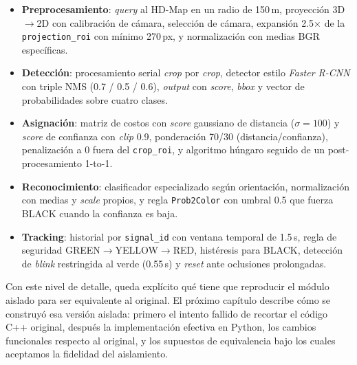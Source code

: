 \begin{itemize}
    \item \textbf{Preprocesamiento}: \textit{query} al HD-Map en un radio de 150\,m, proyección 3D$\to$2D con calibración de cámara, selección de cámara, expansión 2.5$\times$ de la \texttt{projection\_roi} con mínimo 270\,px, y normalización con medias BGR específicas.
    \item \textbf{Detección}: procesamiento serial \textit{crop} por \textit{crop}, detector estilo \textit{Faster R-CNN} con triple NMS (0.7 / 0.5 / 0.6), \textit{output} con \textit{score}, \textit{bbox} y vector de probabilidades sobre cuatro clases.
    \item \textbf{Asignación}: matriz de costos con \textit{score} gaussiano de distancia ($\sigma = 100$) y \textit{score} de confianza con \textit{clip} 0.9, ponderación 70/30 (distancia/confianza), penalización a 0 fuera del \texttt{crop\_roi}, y algoritmo húngaro seguido de un post-procesamiento 1-to-1.
    \item \textbf{Reconocimiento}: clasificador especializado según orientación, normalización con medias y \textit{scale} propios, y regla \texttt{Prob2Color} con umbral 0.5 que fuerza BLACK cuando la confianza es baja.
    \item \textbf{Tracking}: historial por \texttt{signal\_id} con ventana temporal de 1.5\,s, regla de seguridad GREEN$\to$YELLOW$\to$RED, histéresis para BLACK, detección de \textit{blink} restringida al verde (0.55\,s) y \textit{reset} ante oclusiones prolongadas.
\end{itemize}

Con este nivel de detalle, queda explícito qué tiene que reproducir el módulo aislado para ser equivalente al original. El próximo capítulo describe cómo se construyó esa versión aislada: primero el intento fallido de recortar el código C++ original, después la implementación efectiva en Python, los cambios funcionales respecto al original, y los supuestos de equivalencia bajo los cuales aceptamos la fidelidad del aislamiento.
